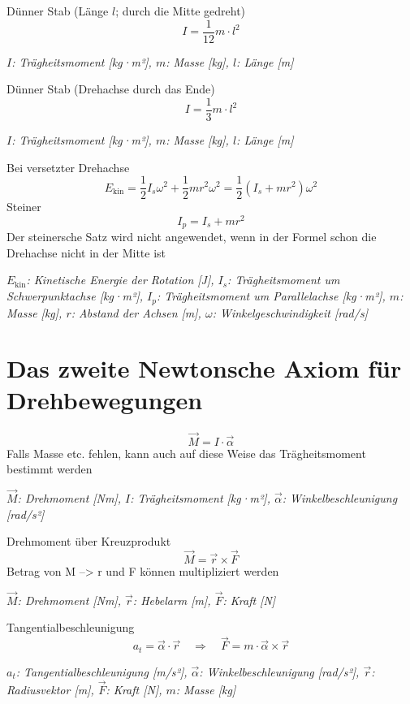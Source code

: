 \documentclass[a4paper,10pt]{article}
\newenvironment{displayformula}
{
	\begin{framed}
		\color{formulaColor}
	}
	{\end{framed}}
\newcommand{\formulalegend}[1]{%
	\par\vspace{0.5ex}%
	{{\color{legendColor}\RaggedRight\small\textit{#1}}}%
	\par\vspace{1.5ex}%
}
\begin{document}
\begin{displayformula}
	Dünner Stab (Länge \( l \); durch die Mitte gedreht)
	\[
	I = \frac{1}{12} m \cdot l^2
	\]
\end{displayformula}
\formulalegend{
	\( I \): Trägheitsmoment [kg·m²], \( m \): Masse [kg], \( l \): Länge [m]
}

\begin{displayformula}
	Dünner Stab (Drehachse durch das Ende)
	\[
	I = \frac{1}{3} m \cdot l^2
	\]
\end{displayformula}
\formulalegend{
	\( I \): Trägheitsmoment [kg·m²], \( m \): Masse [kg], \( l \): Länge [m]
}

\begin{displayformula}
	Bei versetzter Drehachse
	\[
	E_{\text{kin}} = \frac{1}{2} I_s \omega^2 + \frac{1}{2} m r^2 \omega^2 = \frac{1}{2} (I_s + m r^2) \omega^2
	\]
	Steiner
	\[
	I_p = I_s + m r^2
	\]
	Der steinersche Satz wird nicht angewendet, wenn in der Formel schon die Drehachse nicht in der Mitte ist
\end{displayformula}
\formulalegend{
	\( E_{\text{kin}} \): Kinetische Energie der Rotation [J], \( I_s \): Trägheitsmoment um Schwerpunktachse [kg·m²], \( I_p \): Trägheitsmoment um Parallelachse [kg·m²], \( m \): Masse [kg], \( r \): Abstand der Achsen [m], \( \omega \): Winkelgeschwindigkeit [rad/s]
}

\section{Das zweite Newtonsche Axiom für Drehbewegungen}

\begin{displayformula}
	\[
	\vec{M} = I \cdot \vec{\alpha}
	\]
	Falls Masse etc. fehlen, kann auch auf diese Weise das Trägheitsmoment bestimmt werden
\end{displayformula}
\formulalegend{
	\( \vec{M} \): Drehmoment [Nm], \( I \): Trägheitsmoment [kg·m²], \( \vec{\alpha} \): Winkelbeschleunigung [rad/s²]
}

\begin{displayformula}
	Drehmoment über Kreuzprodukt
	\[
	\vec{M} = \vec{r} \times \vec{F}
	\]
	Betrag von M --> r und F können multipliziert werden
\end{displayformula}
\formulalegend{
	\( \vec{M} \): Drehmoment [Nm], \( \vec{r} \): Hebelarm [m], \( \vec{F} \): Kraft [N]
}

\begin{displayformula}
	Tangentialbeschleunigung
	\[
	a_t = \vec{\alpha} \cdot \vec{r} \quad \Rightarrow \quad \vec{F} = m \cdot \vec{\alpha} \times \vec{r}
	\]
\end{displayformula}
\formulalegend{
	\( a_t \): Tangentialbeschleunigung [m/s²], \( \vec{\alpha} \): Winkelbeschleunigung [rad/s²], \( \vec{r} \): Radiusvektor [m], \( \vec{F} \): Kraft [N], \( m \): Masse [kg]
}
\end{document}
